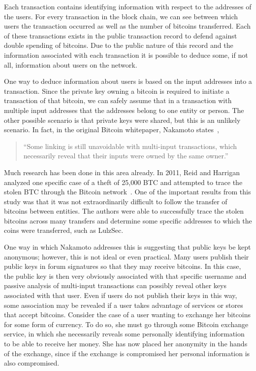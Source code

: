 \documentclass[11pt]{article}
\begin{document}
Each transaction contains identifying information with respect to the addresses of the users. For every transaction in
the block chain, we can see between which users the transaction occurred as well as the number of bitcoins transferred.
Each of these transactions exists in the public transaction record to defend against double spending of bitcoins. Due to
the public nature of this record and the information associated with each transaction it is possible to deduce some, if
not all, information about users on the network.

One way to deduce information about users is based on the input addresses into a transaction. Since the private key
owning a bitcoin is required to initiate a transaction of that bitcoin, we can safely assume that in a transaction with
multiple input addresses that the addresses belong to one entity or person. The other possible scenario is that private
keys were shared, but this is an unlikely scenario. In fact, in the original Bitcoin whitepaper, Nakamoto
states~\cite{nakamoto08},
    \begin{quote}
        ``Some linking is still unavoidable with multi-input transactions, which
        necessarily reveal that their inputs were owned by the same owner.''
    \end{quote}

Much research has been done in this area already. In 2011, Reid and Harrigan analyzed one specific case of a theft of
25,000 BTC and attempted to trace the stolen BTC through the Bitcoin network~\cite{reid11}. One of the important results
from this study was that it was not extraordinarily difficult to follow the transfer of bitcoins between entities. The
authors were able to successfully trace the stolen bitcoins across many transfers and determine some specific addresses
to which the coins were transferred, such as LulzSec.

One way in which Nakamoto addresses this is suggesting that public keys be kept anonymous; however, this is not ideal or
even practical. Many users publish their public keys in forum signatures so that they may receive bitcoins.  In this
case, the public key is then very obviously associated with that specific username and passive analysis of multi-input
transactions can possibly reveal other keys associated with that user. Even if users do not publish their keys in this
way, some association may be revealed if a user takes advantage of services or stores that accept bitcoins. Consider the
case of a user wanting to exchange her bitcoins for some form of currency. To do so, she must go through some Bitcoin
exchange service, in which she necessarily reveals some personally identifying information to be able to receive her
money. She has now placed her anonymity in the hands of the exchange, since if the exchange is compromised her personal
information is also compromised.
\end{document}
